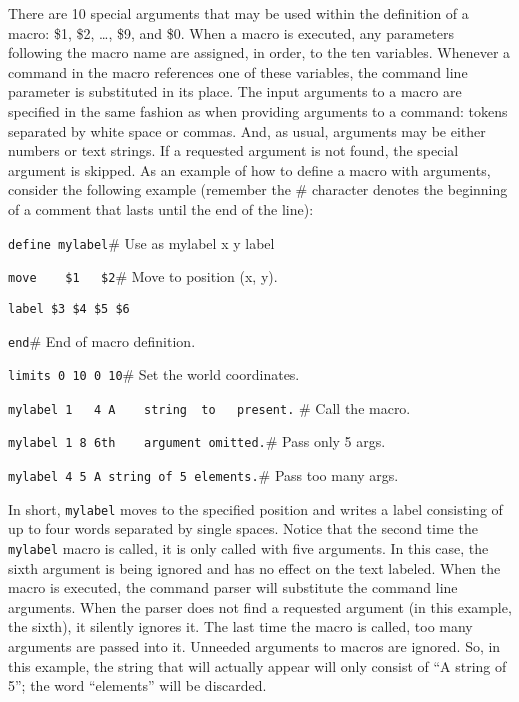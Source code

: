 There are 10 special arguments that may be used within the definition of
a macro: \$1, \$2, \ldots, \$9, and \$0.
When a macro is executed, any parameters following the macro name are
assigned, in order, to the ten variables.
Whenever a command in the macro references one of these variables,
the command line parameter is substituted in its place.
The input arguments to a macro are specified in the same fashion as when
providing arguments to a command:
tokens separated by white space or commas.
And, as usual, arguments may be either numbers or text strings.
If a requested argument is not found, the special argument is skipped.
As an example of how to define a macro with arguments, consider
the following example (remember the \# character denotes the beginning
of a comment that lasts until the end of the line):
\begin{wiplist}%
  \item [\wipp] {\tt define mylabel}\hfill\# Use as mylabel x y label
\samepage
  \item [\wipd] {\tt move~~~~\$1~~~\$2}\hfill\# Move to position (x, y).
  \item [\wipd] {\tt label \$3 \$4 \$5 \$6}
  \item [\wipd] {\tt end}\hfill\# End of macro definition.
  \item [\wipp] {\tt limits 0 10 0 10}\hfill\# Set the world coordinates.
  \item [\wipp] {\tt mylabel 1~~~4 A~~~ string\ \ to~~~present.}\hfill
    \# Call the macro.
  \item [\wipp] {\tt mylabel 1 8 6th~~~~argument omitted.}\hfill\# Pass
    only 5 args.
  \item [\wipp] {\tt mylabel 4 5 A string of 5 elements.}\hfill\# Pass
    too many args.
\end{wiplist}
In short, {\tt mylabel} moves to the specified position and writes a label
consisting of up to four words separated by single spaces.
Notice that the second time the {\tt mylabel} macro is called,
it is only called with five arguments.
In this case, the sixth argument is being ignored and has no effect
on the text labeled.
When the macro is executed, the command parser will substitute the
command line arguments.
When the parser does not find a requested argument (in this example, the
sixth), it silently ignores it.
The last time the macro is called, too many arguments are passed into it.
Unneeded arguments to macros are ignored.
So, in this example, the string that will actually appear will only
consist of ``A string of 5''; the word ``elements'' will be discarded.

